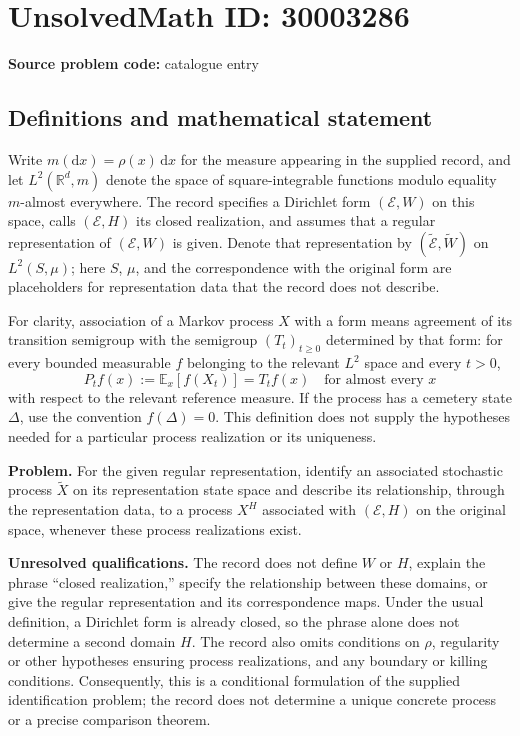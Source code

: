 \documentclass[11pt]{article}
\newcommand{\R}{\mathbb{R}}
\begin{document}
\section*{UnsolvedMath ID: 30003286}
\textbf{Source problem code:} catalogue entry
\subsection{Definitions and mathematical statement}
Write \(m(\mathrm dx)=\rho(x)\,\mathrm dx\) for the measure appearing in the supplied record, and let \(L^2(\R^d,m)\) denote the space of square-integrable functions modulo equality \(m\)-almost everywhere. The record specifies a Dirichlet form \((\mathcal E,W)\) on this space, calls \((\mathcal E,H)\) its closed realization, and assumes that a regular representation of \((\mathcal E,W)\) is given. Denote that representation by \((\widetilde{\mathcal E},\widetilde W)\) on \(L^2(S,\mu)\); here \(S\), \(\mu\), and the correspondence with the original form are placeholders for representation data that the record does not describe.

For clarity, association of a Markov process \(X\) with a form means agreement of its transition semigroup with the semigroup \((T_t)_{t\geq0}\) determined by that form: for every bounded measurable \(f\) belonging to the relevant \(L^2\) space and every \(t>0\),
\[
P_t f(x):=\mathbb E_x[f(X_t)]=T_t f(x)
\quad\text{for almost every }x
\]
with respect to the relevant reference measure. If the process has a cemetery state \(\Delta\), use the convention \(f(\Delta)=0\). This definition does not supply the hypotheses needed for a particular process realization or its uniqueness.

\textbf{Problem.} For the given regular representation, identify an associated stochastic process \(\widetilde X\) on its representation state space and describe its relationship, through the representation data, to a process \(X^H\) associated with \((\mathcal E,H)\) on the original space, whenever these process realizations exist.

\textbf{Unresolved qualifications.} The record does not define \(W\) or \(H\), explain the phrase ``closed realization,'' specify the relationship between these domains, or give the regular representation and its correspondence maps. Under the usual definition, a Dirichlet form is already closed, so the phrase alone does not determine a second domain \(H\). The record also omits conditions on \(\rho\), regularity or other hypotheses ensuring process realizations, and any boundary or killing conditions. Consequently, this is a conditional formulation of the supplied identification problem; the record does not determine a unique concrete process or a precise comparison theorem.
\end{document}
